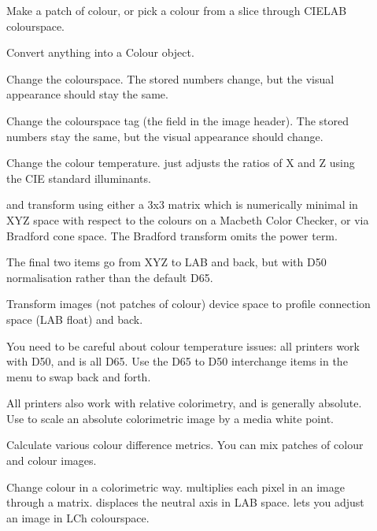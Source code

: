 \begin{description}

\item[]
	Make a patch of colour, or pick a colour from a slice through CIELAB
	colourspace.

\item[]
	Convert anything into a Colour object.

\item[]
	Change the colourspace. The stored numbers change, but the
	visual appearance should stay the same.

\item[]
	Change the colourspace tag (the  field in the image
	header). The stored numbers stay the same, but the visual appearance
	should change.

\item[]
	Change the colour temperature.  just adjusts the
	ratios of X and Z using the CIE standard illuminants.
	
	 and  transform using either a 3x3
	matrix which is numerically minimal in XYZ space with respect to the
	colours on a Macbeth Color Checker, or via Bradford cone space. The
	Bradford transform omits the power term.

	The final two items go from XYZ to LAB and back, but with D50
	normalisation rather than the default D65.

\item[]
	Transform images (not patches of colour) device space to profile 
	connection space (LAB float) and back. 
	
	You need to be careful about colour temperature issues:
	all printers work with D50, and \nip{} is all D65. Use the D65 to D50
	interchange items in the  menu to swap back and
	forth.

	All printers also work with relative colorimetry, and \nip{} is
	generally absolute. Use  to scale an absolute
	colorimetric image by a media white point.

\item[]
	Calculate various colour difference metrics. You can mix patches of
	colour and colour images.

\item[]
	Change colour in a colorimetric way. 
	multiplies each pixel in an image through a matrix. 
	displaces the neutral axis in LAB space.  lets you adjust an
	image in LCh colourspace.


\end{description}
